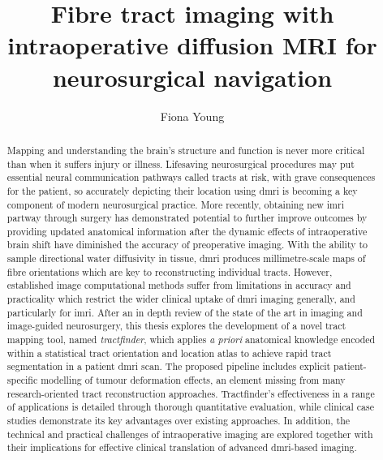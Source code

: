 \documentclass[12pt,phd,a4paper,twoside]{ucl_thesis}
\begin{document}
\clearpage{}

\title{ Fibre tract imaging with intraoperative diffusion MRI for neurosurgical navigation }
\author{ Fiona Young }

\maketitle
\makedeclaration

\begin{abstract} Mapping and understanding the brain's structure and function is never more critical than when it suffers injury or illness.
Lifesaving neurosurgical procedures may put essential neural communication pathways called  tracts at risk, with grave consequences for the patient, so accurately depicting their location using \gls{dmri} is becoming a key component of modern neurosurgical practice.
More recently, obtaining new \gls{imri} partway through surgery has demonstrated potential to further improve outcomes by providing updated anatomical information after the dynamic effects of intraoperative brain shift have diminished the accuracy of preoperative imaging.
With the ability to sample directional water diffusivity in tissue, \gls{dmri} produces millimetre-scale maps of  fibre orientations which are key to reconstructing individual tracts.
However, established image computational methods suffer from limitations in accuracy and practicality which restrict the wider clinical uptake of \gls{dmri}  imaging generally, and particularly for \gls{imri}.
After an in depth review of the state of the art in  imaging and image-guided neurosurgery, this thesis explores the development of a novel  tract mapping tool, named \textit{tractfinder}, which applies \textit{a priori} anatomical knowledge encoded within a statistical tract orientation and location atlas to achieve rapid tract segmentation in a patient \gls{dmri} scan.
The proposed pipeline includes explicit patient-specific modelling of tumour deformation effects, an element missing from many research-oriented tract reconstruction approaches.
Tractfinder's effectiveness in a range of applications is detailed through thorough quantitative evaluation, while clinical case studies demonstrate its key advantages over existing approaches.
In addition, the technical and practical challenges of intraoperative imaging are explored together with their implications for effective clinical translation of advanced \gls{dmri}-based  imaging.
\end{abstract}
\end{document}
